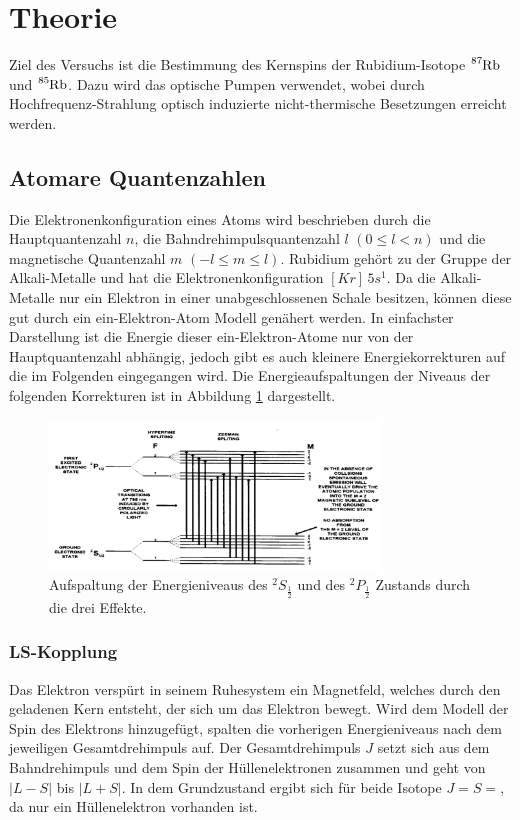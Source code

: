 \section{Theorie}
\label{sec:Theorie}
Ziel des Versuchs ist die Bestimmung des Kernspins der Rubidium-Isotope $\ce{^{87}Rb}$ und $\ce{^{85}Rb}$.
Dazu wird das optische Pumpen verwendet, wobei durch Hochfrequenz-Strahlung optisch induzierte nicht-thermische Besetzungen erreicht werden.

\subsection{Atomare Quantenzahlen}
Die Elektronenkonfiguration eines Atoms wird beschrieben durch die Hauptquantenzahl $n$, die Bahndrehimpulsquantenzahl $l$ $(0 \leq l < n)$ und die
magnetische Quantenzahl $m$ $(-l \leq m \leq l)$. 
Rubidium gehört zu der Gruppe der Alkali-Metalle und hat die
Elektronenkonfiguration $[Kr]\,5s^1$. 
Da die Alkali-Metalle nur ein Elektron in einer unabgeschlossenen Schale besitzen, können diese gut durch ein ein-Elektron-Atom Modell genähert werden.
In einfachster Darstellung ist die Energie dieser ein-Elektron-Atome nur von der Hauptquantenzahl abhängig, jedoch gibt es auch kleinere Energiekorrekturen
auf die im Folgenden eingegangen wird. Die Energieaufspaltungen der Niveaus der folgenden Korrekturen ist in Abbildung \ref{pic:en} dargestellt.
\begin{figure}
    \centering
    \includegraphics[width = 0.78\textwidth]{pics/energielevel.png}
    \caption{Aufspaltung der Energieniveaus des $^2S_{\frac{1}{2}}$ und des $^2P_{\frac{1}{2}}$ Zustands durch die drei Effekte.\cite{op}}
    \label{pic:en}
\end{figure}

\subsubsection{LS-Kopplung}
Das Elektron verspürt in seinem Ruhesystem ein Magnetfeld, welches durch den geladenen Kern entsteht, der sich um das Elektron bewegt.
Wird dem Modell der Spin des Elektrons hinzugefügt, spalten die vorherigen Energieniveaus nach dem jeweiligen Gesamtdrehimpuls auf.
Der Gesamtdrehimpuls $J$ setzt sich aus dem Bahndrehimpuls und dem Spin der Hüllenelektronen zusammen und geht von $|L - S|$ bis $|L + S|$.
In dem Grundzustand ergibt sich für beide Isotope $J = S =$, da nur ein Hüllenelektron vorhanden ist.

